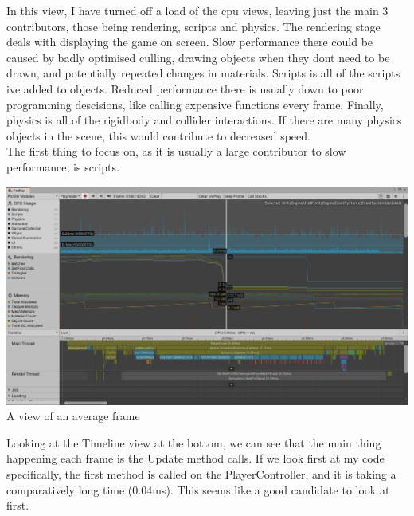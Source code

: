 \documentclass{article}
\begin{document}
In this view, I have turned off a load of the cpu views, leaving just the main 3 contributors, those being rendering, scripts and physics.
The rendering stage deals with displaying the game on screen. Slow performance there could be caused by badly optimised culling, drawing objects when they dont need to be drawn, and potentially repeated changes in materials.
Scripts is all of the scripts ive added to objects. Reduced performance there is usually down to poor programming descisions, like calling expensive functions every frame.
Finally, physics is all of the rigidbody and collider interactions. If there are many physics objects in the scene, this would contribute to decreased speed.\\
The first thing to focus on, as it is usually a large contributor to slow performance, is scripts. 
\begin{center}
    \includegraphics[width=\textwidth]{Images/FirstScripts.png}
    A view of an average frame
\end{center}
Looking at the Timeline view at the bottom, we can see that the main thing happening each frame is the Update method calls. If we look first at my code specifically, the first method is called on the PlayerController, and it is taking a comparatively long time (0.04ms). This seems like a good candidate to look at first.
\end{document}
